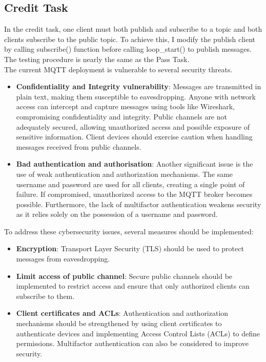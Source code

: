 \documentclass[a4paper, 12pt]{article}
\begin{document}
\subsection{Credit Task}
    In the credit task, one client must both publish and subscribe to a topic and both clients subscribe to the public topic. To achieve this, I modify the publish client by calling subscribe() function before calling loop\_start() to publish messages. The testing procedure is nearly the same as the Pass Task. \\

    The current MQTT deployment is vulnerable to several security threats.
    \begin{itemize}
        \item \textbf{Confidentiality and Integrity vulnerability}: Messages are transmitted in plain text, making them susceptible to eavesdropping. Anyone with network access can intercept and capture messages using tools like Wireshark, compromising confidentiality and integrity. Public channels are not adequately secured, allowing unauthorized access and possible exposure of sensitive information. Client devices should exercise caution when handling messages received from public channels.
        \item \textbf{Bad authentication and authorisation}: Another significant issue is the use of weak authentication and authorization mechanisms. The same username and password are used for all clients, creating a single point of failure. If compromised, unauthorized access to the MQTT broker becomes possible. Furthermore, the lack of multifactor authentication weakens security as it relies solely on the possession of a username and password. 
    \end{itemize}
    To address these cybersecurity issues, several measures should be implemented:
    \begin{itemize}
        \item \textbf{Encryption}: Transport Layer Security (TLS) should be used to protect messages from eavesdropping. 
        \item \textbf{Limit access of public channel}: Secure public channels should be implemented to restrict access and ensure that only authorized clients can subscribe to them.
        \item \textbf{Client certificates and ACLs}: Authentication and authorization mechanisms should be strengthened by using client certificates to authenticate devices and implementing Access Control Lists (ACLs) to define permissions. Multifactor authentication can also be considered to improve security.
    \end{itemize}
    
\end{document}
